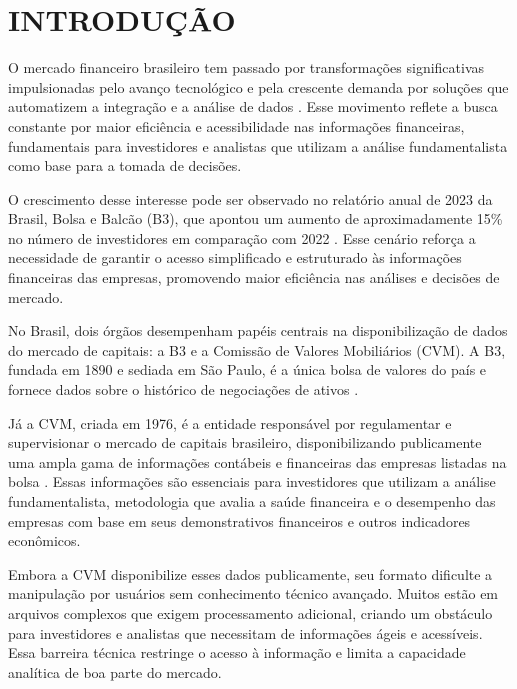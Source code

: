 \documentclass[recuosum=1.5cm]{iftex2024}
\begin{document}
\maketitle

\chapter{INTRODUÇÃO}

O mercado financeiro brasileiro tem passado por transformações significativas impulsionadas pelo avanço tecnológico e pela crescente demanda por soluções que automatizem a integração e a análise de dados \cite{dantas:2020:comportamento}. Esse movimento reflete a busca constante por maior eficiência e acessibilidade nas informações financeiras, fundamentais para investidores e analistas que utilizam a análise fundamentalista como base para a tomada de decisões. 

O crescimento desse interesse pode ser observado no relatório anual de 2023 da Brasil, Bolsa e Balcão (B3), que apontou um aumento de aproximadamente 15\% no número de investidores em comparação com 2022 \cite{b3:2023:relatorio}. Esse cenário reforça a necessidade de garantir o acesso simplificado e estruturado às informações financeiras das empresas, promovendo maior eficiência nas análises e decisões de mercado.

No Brasil, dois órgãos desempenham papéis centrais na disponibilização de dados do mercado de capitais: a B3 e a Comissão de Valores Mobiliários (CVM). A B3, fundada em 1890 e sediada em São Paulo, é a única bolsa de valores do país e fornece dados sobre o histórico de negociações de ativos \cite{b3:2023:investidores}. 

Já a CVM, criada em 1976, é a entidade responsável por regulamentar e supervisionar o mercado de capitais brasileiro, disponibilizando publicamente uma ampla gama de informações contábeis e financeiras das empresas listadas na bolsa \cite{cvm:2009:informacao}. Essas informações são essenciais para investidores que utilizam a análise fundamentalista, metodologia que avalia a saúde financeira e o desempenho das empresas com base em seus demonstrativos financeiros e outros indicadores econômicos.

Embora a CVM disponibilize esses dados publicamente, seu formato dificulte a manipulação por usuários sem conhecimento técnico avançado. Muitos estão em arquivos complexos que exigem processamento adicional, criando um obstáculo para investidores e analistas que necessitam de informações ágeis e acessíveis. Essa barreira técnica restringe o acesso à informação e limita a capacidade analítica de boa parte do mercado.
\end{document}
